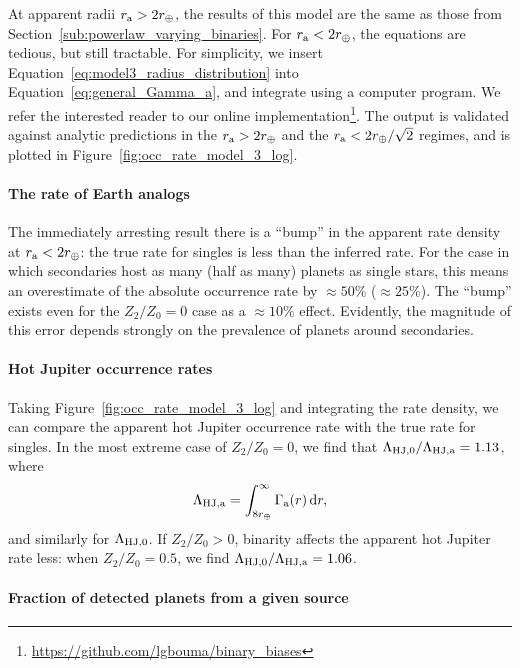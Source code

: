 \documentclass[12pt,modern]{aastex61}
\renewcommand{\a}{_{\rm a}}
\begin{document}
At apparent radii $r\a > 2r_\oplus$, the results of this model are the same as 
those from Section~\ref{sub:powerlaw_varying_binaries}.
For $r\a < 2r_\oplus$, the equations are tedious, but still tractable.
For simplicity, we insert Equation~\ref{eq:model3_radius_distribution} into 
Equation~\ref{eq:general_Gamma_a}, and integrate using a computer 
program. We refer the interested reader to our online 
implementation\footnote{\url{https://github.com/lgbouma/binary_biases}}.
The output is validated against analytic predictions in the $r\a > 
2r_\oplus$ and the $r\a < 2r_\oplus/\sqrt{2}$ regimes, and is plotted in
Figure~\ref{fig:occ_rate_model_3_log}.


\paragraph{The rate of Earth analogs}
The immediately arresting result there is a ``bump'' in the apparent rate 
density at $r\a < 2r_\oplus$: the true rate for singles is less than the 
inferred rate.
For the case in which secondaries host as many (half as many) planets as 
single stars, this means an overestimate of the absolute occurrence rate by 
$\approx 50\%$ ($\approx 25\%$).
The ``bump'' exists even for the $Z_2/Z_0=0$ case as a $\approx 10\%$ effect.
Evidently, the magnitude of this error depends strongly on the prevalence of 
planets around secondaries.

\paragraph{Hot Jupiter occurrence rates}
Taking Figure~\ref{fig:occ_rate_model_3_log} and integrating the rate density, 
we can compare the apparent hot Jupiter 
occurrence rate with the true rate for singles.
In the most extreme case of $Z_2/Z_0=0$, we find that $\Lambda_{{\rm 
HJ},0}/\Lambda_{\rm HJ,a} = 1.13$, where
\begin{equation}
\Lambda_{\rm HJ,a} = \int_{8r_\oplus}^{\infty} \Gamma\a(r)\,{\rm d}r,
\end{equation}
and similarly for $\Lambda_{\rm HJ,0}$.
If $Z_2/Z_0>0$, binarity affects the apparent hot Jupiter rate less: when 
$Z_2/Z_0=0.5$, we find $\Lambda_{{\rm HJ},0}/\Lambda_{\rm HJ,a} = 1.06$.

\paragraph{Fraction of detected planets from a given source}
\end{document}
